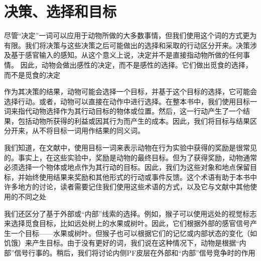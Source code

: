 \section{决策、选择和目标}
尽管“决定”一词可以应用于动物所做的大多数事情，但我们使用这个词的方式更为有限。我们将决策与这些决策之后可能做出的选择和采取的行动区分开来\cite{Schall 2001}。决策涉及基于感官输入的感知。从这个意义上说，决定并不是直接指动物所做的任何事情。
因此，动物会做出感性的决定，而不是感性的选择。它们做出觅食的选择，而不是觅食的决定\par
作为其决策的结果，动物可能会选择一个目标，并基于这个目标的选择，它可能会选择行动。或者，动物可以直接在动作中进行选择。在整本书中，我们使用目标一词来指代动物选择作为其行动目标的物体或位置。然后，这一行动产生了一个结果，包括动物所获得的利益或因其行为而产生的成本。因此，我们将目标与结果区分开来，从不将目标一词用作结果的同义词。\par
我们知道，在文献中，使用目标一词来表示动物在行为实验中获得的奖励是很常见的。事实上，在这些实验中，奖励是动物的最终目标。但为了获得奖励，动物通常必须选择一个物体或地点作为其行动的目标。因此，我们为这些对象和地点保留目标，并始终使用结果来奖励和其他形式的行动或事件反馈。这个术语有助于本书中许多地方的讨论，读者需要记住我们使用这些术语的方式，以及它与文献中其他使用的不同之处\par
我们还区分了基于外部或“内部”线索的选择\cite{Passingham等人,2010年}。例如，猴子可以使用远处的视觉标志来选择觅食目标，比如远处树上的水果或树叶。因此，它们根据外部的感官信号产生一个目标——水果或树叶。但猴子也可以根据它们的记忆或内部状态的变化（如饥饿）来产生目标。由于没有更好的词，我们说在这种情况下，动物是根据“内部”信号行事的。稍后，我们将讨论内侧PF皮层在外部和“内部”信号竞争时的作用\par
